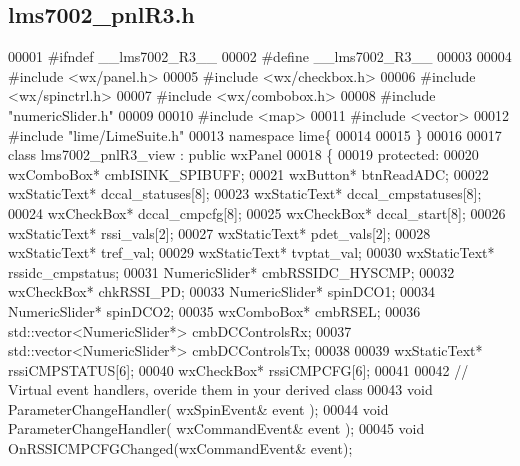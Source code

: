 \subsection{lms7002\+\_\+pnl\+R3.\+h}
\label{lms7002__pnlR3_8h_source}

\begin{DoxyCode}
00001 \textcolor{preprocessor}{#ifndef \_\_lms7002\_R3\_\_}
00002 \textcolor{preprocessor}{#define \_\_lms7002\_R3\_\_}
00003 
00004 \textcolor{preprocessor}{#include <wx/panel.h>}
00005 \textcolor{preprocessor}{#include <wx/checkbox.h>}
00006 \textcolor{preprocessor}{#include <wx/spinctrl.h>}
00007 \textcolor{preprocessor}{#include <wx/combobox.h>}
00008 \textcolor{preprocessor}{#include "numericSlider.h"}
00009 
00010 \textcolor{preprocessor}{#include <map>}
00011 \textcolor{preprocessor}{#include <vector>}
00012 \textcolor{preprocessor}{#include "lime/LimeSuite.h"}
00013 \textcolor{keyword}{namespace }lime\{
00014 
00015 \}
00016 
00017 \textcolor{keyword}{class }lms7002_pnlR3_view : \textcolor{keyword}{public} wxPanel
00018 \{
00019     \textcolor{keyword}{protected}:
00020         wxComboBox* cmbISINK_SPIBUFF;
00021         wxButton* btnReadADC;
00022         wxStaticText* dccal\_statuses[8];
00023         wxStaticText* dccal\_cmpstatuses[8];
00024         wxCheckBox* dccal\_cmpcfg[8];
00025         wxCheckBox* dccal\_start[8];
00026         wxStaticText* rssi\_vals[2];
00027         wxStaticText* pdet\_vals[2];
00028         wxStaticText* tref_val;
00029         wxStaticText* tvptat_val;
00030         wxStaticText* rssidc_cmpstatus;
00031                 NumericSlider* cmbRSSIDC_HYSCMP;
00032                 wxCheckBox* chkRSSI_PD;
00033                 NumericSlider* spinDCO1;
00034                 NumericSlider* spinDCO2;
00035                 wxComboBox* cmbRSEL;
00036         std::vector<NumericSlider*> cmbDCControlsRx;
00037         std::vector<NumericSlider*> cmbDCControlsTx;
00038 
00039         wxStaticText* rssiCMPSTATUS[6];
00040         wxCheckBox* rssiCMPCFG[6];
00041 
00042         \textcolor{comment}{// Virtual event handlers, overide them in your derived class}
00043         \textcolor{keywordtype}{void} ParameterChangeHandler( wxSpinEvent& event );
00044         \textcolor{keywordtype}{void} ParameterChangeHandler( wxCommandEvent& event );
00045         \textcolor{keywordtype}{void} OnRSSICMPCFGChanged(wxCommandEvent& event);

\end{DoxyCode}
